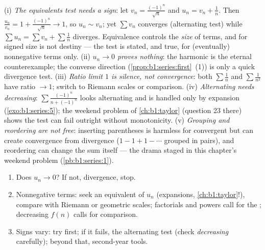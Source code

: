 \begin{remark}
(i) \emph{The equivalents test needs a sign}: let $v_n =
\frac{(-1)^n}{\sqrt n}$ and $u_n = v_n + \frac1n$. Then
$\frac{u_n}{v_n} = 1 + \frac{(-1)^n}{\sqrt n} \to 1$, so $u_n
\sim v_n$; yet $\sum v_n$ converges (alternating test) while
$\sum u_n = \sum v_n + \sum \frac1n$ diverges. Equivalence
controls the \emph{size} of terms, and for signed  size
is not destiny --- the test is stated, and true, for
(eventually) nonnegative terms only. (ii) \emph{$u_n \to 0$
proves nothing}: the harmonic  is the eternal
counterexample; the converse direction
(\cref{prop:b1:series:first}~(1)) is only a quick divergence
test. (iii) \emph{Ratio limit $1$ is silence, not
convergence}: both $\sum\frac1n$ and $\sum\frac{1}{n^2}$ have
ratio $\to 1$; switch to Riemann scales or  comparison.
(iv) \emph{Alternating needs decreasing}: $\sum
\frac{(-1)^n}{n + (-1)^n}$ looks alternating and is handled
only by expansion (\cref{exo:b1:series:5}); the weekend problem
of \cref{ch:b1:taylor} (question 23 there) shows the test can
fail outright without monotonicity. (v) \emph{Grouping and
reordering are not free}: inserting parentheses is harmless for
convergent  but can create convergence from divergence
($1 - 1 + 1 - \cdots$ grouped in pairs), and reordering can
change the sum itself --- the drama staged in this chapter's
weekend problem (\cref{pb:b1:series:1}).
\end{remark}

\begin{method}\label{met:b1:series:decide}
\begin{enumerate}
  \item Does $u_n \to 0$? If not, divergence, stop.
  \item Nonnegative terms: seek an equivalent of $u_n$ (expansions,
        \cref{ch:b1:taylor}!), compare with Riemann or geometric
        scales; factorials and powers call for the ;
        decreasing $f(n)$ calls for  comparison.
  \item Signs vary: try  first; if it fails, the
        alternating test (check \emph{decreasing} carefully); beyond
        that, second-year tools.
\end{enumerate}
\end{method}

